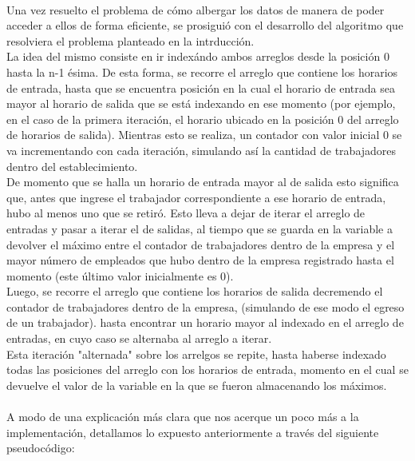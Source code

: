 \paragraph{}
Una vez resuelto el problema de cómo albergar los datos de manera de poder acceder a ellos de forma eficiente, se prosiguió con el desarrollo del algoritmo que resolviera el problema planteado en la intrducci\'on. \\
La idea del mismo consiste en ir index\'ando ambos arreglos desde la posici\'on 0 hasta la n-1 \'esima. De esta forma, se recorre el arreglo que contiene los horarios de entrada, hasta que se encuentra posici\'on en la cual el horario de entrada sea mayor al horario de salida que se est\'a indexando en ese momento (por ejemplo, en el caso de la primera iteraci\'on, el horario ubicado en la posici\'on 0 del arreglo de horarios de salida). Mientras esto se realiza, un contador con valor inicial 0 se va incrementando con cada iteraci\'on, simulando as\'i la cantidad de trabajadores dentro del establecimiento.\\
De momento que se halla un horario de entrada mayor al de salida esto significa que, antes que ingrese el trabajador correspondiente a ese horario de entrada, hubo al menos uno que se retir\'o. Esto lleva a dejar de iterar el arreglo de entradas y pasar a iterar el de salidas, al tiempo que se guarda en la variable a devolver el máximo entre el contador de trabajadores dentro de la empresa y el mayor n\'umero de empleados que hubo dentro de la empresa registrado hasta el momento (este \'ultimo valor inicialmente es 0). \\
Luego, se recorre el arreglo que contiene los horarios de salida decremendo el contador de trabajadores dentro de la empresa, (simulando de ese modo el egreso de un trabajador). hasta encontrar un horario mayor al indexado en el arreglo de entradas, en cuyo caso se alternaba al arreglo a iterar.\\
Esta iteraci\'on "alternada" sobre los arrelgos se repite, hasta haberse indexado todas las posiciones del arreglo con los horarios de entrada, momento en el cual se devuelve el valor de la variable en la que se fueron almacenando los m\'aximos.

\paragraph{}
A modo de una explicaci\'on m\'as clara que nos acerque un poco m\'as a la implementaci\'on, detallamos lo expuesto anteriormente a trav\'es del siguiente pseudoc\'odigo:

